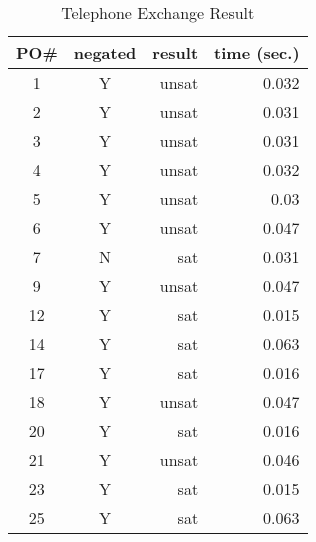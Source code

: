 %
\begin{table}[htb]
\begin{center}
\begin{tabular}{|c|c|r|r|}
\hline
PO\#	&	negated	&	result	&	time (sec.) \\ \hline
1		&	Y		&	unsat	&	0.032 \\ \hline
2		&	Y		&	unsat	&	0.031 \\ \hline
3		&	Y		&	unsat	&	0.031 \\ \hline
4		&	Y		&	unsat	&	0.032 \\ \hline
5		&	Y		&	unsat	&	0.03 \\ \hline
6		&	Y		&	unsat	&	0.047 \\ \hline
7		&	N		&	sat		&	0.031 \\ \hline
9		&	Y		&	unsat	&	0.047 \\ \hline
12		&	Y		&	sat		&	0.015 \\ \hline
14		&	Y		&	sat		&	0.063 \\ \hline
17		&	Y		&	sat		&	0.016 \\ \hline
18		&	Y		&	unsat	&	0.047 \\ \hline
20		&	Y		&	sat		&	0.016 \\ \hline
21		&	Y		&	unsat	&	0.046 \\ \hline
23		&	Y		&	sat		&	0.015 \\ \hline
25		&	Y		&	sat		&	0.063 \\ \hline
\end{tabular}
\end{center}
\caption{Telephone Exchange Result}
\label{tbl:result2}
\vspace{-20pt}
\end{table}





